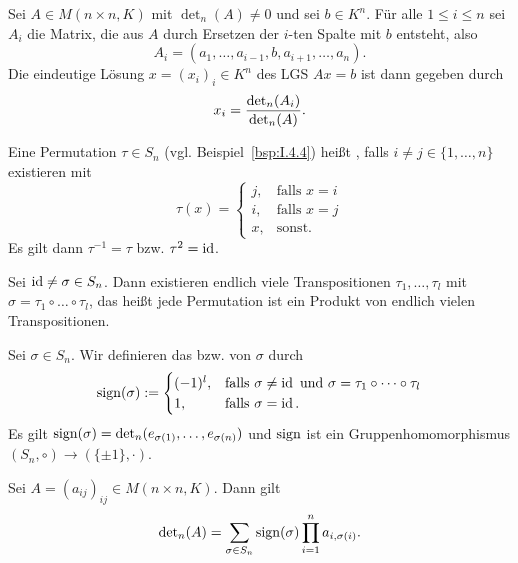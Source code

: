 \setcounter{satz}{7}
\begin{satz}
	\label{satz:I.14.8}
	Sei $A \in M(n \times n,K)$ mit $\det_n(A) \neq 0$ und sei $b \in K^n$.
	Für alle $1 \leq i \leq n$ sei $A_i$ die Matrix, die aus $A$ durch Ersetzen der $i$-ten Spalte mit $b$ entsteht, also
	\[
		A_i = (a_1,\dots,a_{i-1},b,a_{i+1},\dots,a_n).
	\]
	Die eindeutige Lösung $x = (x_i)_i \in K^n$ des LGS $Ax = b$ ist dann gegeben durch
	\[
		x_i = \frac{\operatorname{\det\,\!}_n(A_i)}{\operatorname{\det\,\!}_n(A)}.
	\]
\end{satz}

\setcounter{satz}{9}
\begin{definition}[Transposition]
	\label{def:I.14.10}
	Eine Permutation $\tau \in S_n$ (vgl. Beispiel~\ref{bsp:I.4.4}) heißt , falls $i \neq j \in \{1,\dots,n\}$ existieren mit
	\[
		\tau(x) = \begin{cases}
			j, & \text{falls } x = i \\
			i, & \text{falls } x = j \\
			x, & \text{sonst.}
		\end{cases}
	\]
	Es gilt dann $\tau^{-1} = \tau$ bzw. $\tau^2 = \operatorname{id}$.
\end{definition}

\begin{lemma}
	\label{lemma:I.14.11}
	Sei $\operatorname{id} \neq \sigma \in S_n$.
	Dann existieren endlich viele Transpositionen $\tau_1,\dots,\tau_l$ mit $\sigma = \tau_1 \circ \dots \circ \tau_l$, das heißt jede Permutation ist ein Produkt von endlich vielen Transpositionen.
\end{lemma}

\setcounter{satz}{12}
\begin{definition}[Signum]
	\label{def:I.14.13}
	Sei $\sigma \in S_n$.
	Wir definieren das  bzw.  von $\sigma$ durch
	\[
		\operatorname{sign}(\sigma) := \begin{cases}
			(-1)^l, & \text{falls } \sigma \neq \operatorname{id} \text{ und } \sigma = \tau_1 \circ \dots \circ \tau_l \\
			1, & \text{falls } \sigma = \operatorname{id}.
		\end{cases}
	\]
	Es gilt $\operatorname{sign}(\sigma) = \operatorname{\det\,\!}_n(e_{\sigma(1)},\dots,e_{\sigma(n)})$ und $\operatorname{sign}$ ist ein Gruppenhomomorphismus $(S_n,\circ) \rightarrow(\{\pm 1\},\cdot)$.
\end{definition}

\setcounter{satz}{14}
\begin{satz}
	\label{satz:I.14.15}
	Sei $A = (a_{ij})_{ij} \in M(n \times n,K)$.
	Dann gilt 
	\[
		\operatorname{\det\,\!}_n(A) = \sum_{\sigma \in S_n}^{} \operatorname{sign}(\sigma) \prod_{i=1}^{n} a_{i,\sigma(i)}.
	\]
\end{satz}
\cleardoubleoddemptypage